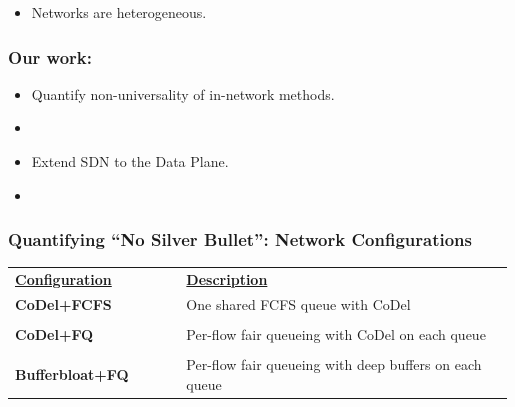 \begin{Large}
\begin{frame}[plain]
\begin{itemize}
\item{Networks are heterogeneous.}

\end{itemize}
\end{frame}

\begin{frame}[plain]
\frametitle{Our work:}
\begin{itemize}
\item{Quantify non-universality of in-network methods.}
\item[]

\item{Extend SDN to the Data Plane.}
\item[]

\end{itemize}
\end{frame}

\begin{frame}[plain]
\frametitle{Quantifying ``No Silver Bullet'': Network Configurations}
\begin{table}
\begin{tabular}{|p{0.34\linewidth}|p{0.65\linewidth}|}
\hline
{\bf \underline{Configuration}} & {\bf \underline{Description}} \\
{\bf CoDel+FCFS} & One shared FCFS queue with CoDel\\
& \\
{\bf CoDel+FQ} & Per-flow fair queueing with CoDel on each queue\\ 
&\\
{\bf Bufferbloat+FQ} & Per-flow fair queueing with deep buffers on
each queue\\ 
\hline
\end{tabular}
\end{table}
\end{frame}


\end{Large}
